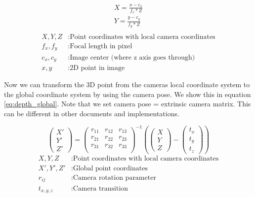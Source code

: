\documentclass[11pt,a4paper,titlepage,oneside]{report}
\begin{document}
\begin{equation}\label{eq:depth_xy}
  \begin{gathered}
    X = \frac{x-c_x}{f_x*Z}\\
    Y = \frac{y-c_y}{f_y*Z}\\
  \end{gathered}
\end{equation}
\begin{align*}
  X,Y,Z    &: \text{Point coordinates with local camera coordinates}\\
  f_x,f_y  &: \text{Focal length in pixel}\\
  c_x,c_y  &: \text{Image center (where z axis goes through)}\\
  x,y      &: \text{2D point in image}
\end{align*}

Now we can transform the 3D point from the cameras local coordinate system to the global coordinate system by using the camera pose. We show this in equation \ref{eq:depth_global}. Note that we set camera pose = extrinsic camera matrix. This can be different in other documents and implementations.

\begin{equation}\label{eq:depth_global}
  \begin{pmatrix}
    X'\\
    Y'\\
    Z'
  \end{pmatrix}=
  \begin{pmatrix}
    r_{11} & r_{12} & r_{13}\\
    r_{21} & r_{22} & r_{23}\\
    r_{31} & r_{32} & r_{33}\\
  \end{pmatrix}^{-1}
  \left(
  \begin{pmatrix}
    X\\
    Y\\
    Z
  \end{pmatrix}
  -\begin{pmatrix}
    t_x\\
    t_y\\
    t_z
  \end{pmatrix}
  \right)
\end{equation}
\begin{align*}
  X,Y,Z     &: \text{Point coordinates with local camera coordinates}\\
  X',Y',Z'  &: \text{Global point coordinates}\\
  r_{ij}    &: \text{Camera rotation parameter}\\
  t_{x,y,z} &: \text{Camera transition}
\end{align*}
\end{document}
